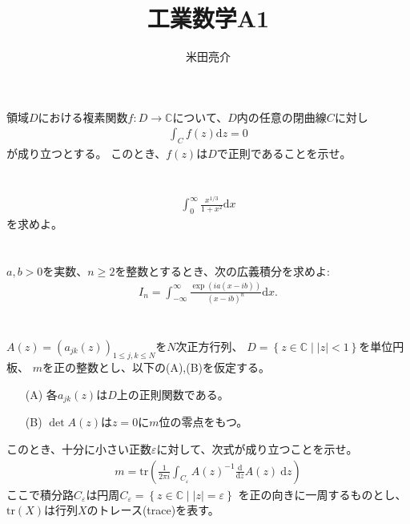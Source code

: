 \documentclass{jsarticle}
\def\diff{\textrm{d}}
\begin{document}
\title{工業数学A1}
\author{米田亮介}
\maketitle	

\section*{}
領域$D$における複素関数$f:D\to\mathbb{C}$について、$D$内の任意の閉曲線$C$に対し
\begin{align*}
    \int_{C}f(z)\diff z=0
\end{align*}
が成り立つとする。
このとき、$f(z)$は$D$で正則であることを示せ。

\section*{}
\begin{align*}
    \int_{0}^{\infty}\frac{x^{1/3}}{1+x^{2}}\diff x
\end{align*}
を求めよ。

\section*{}
$a,b>0$を実数、$n\geq 2$を整数とするとき、次の広義積分を求めよ:
\begin{align*}
    I_{n}=\int_{-\infty}^{\infty}\frac{\exp(ia(x-ib))}{(x-ib)^{n}}\diff x.
\end{align*}

\section*{}
$A(z)=(a_{jk}(z))_{1\leq j,k\leq N}$を$N$次正方行列、
$D=\left\{z\in\mathbb{C}\mid |z|<1\right\}$を単位円板、
$m$を正の整数とし、以下の(A),(B)を仮定する。
\begin{enumerate}
\item[(A)] 各$a_{jk}(z)$は$D$上の正則関数である。
\item[(B)] $\det A(z)$は$z=0$に$m$位の零点をもつ。 
\end{enumerate}
このとき、十分に小さい正数$\varepsilon$に対して、次式が成り立つことを示せ。
\begin{align}
m=\mathrm{tr}\left(\frac{1}{2\pi i}\int_{C_{\varepsilon}}A(z)^{-1}\frac{\diff}{\diff z}A(z)~\diff z\right)
\end{align}
ここで積分路$C_{\varepsilon}$は円周$C_{\varepsilon}=\left\{z\in\mathbb{C}\mid |z|=\varepsilon\right\}$
を正の向きに一周するものとし、$\mathrm{tr}(X)$は行列$X$のトレース(trace)を表す。
\end{document}
